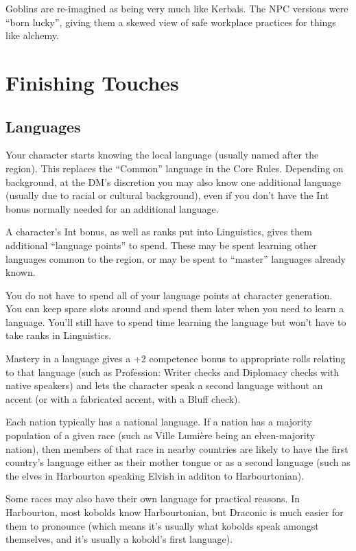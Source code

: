 Goblins are re-imagined as being very much like Kerbals. The NPC versions
were ``born lucky'', giving them a skewed view of safe workplace practices
for things like alchemy.

%
%
\clearpage
\section{Finishing Touches}

%
\subsection{Languages}

Your character starts knowing the local language (usually named after the
region). This replaces the ``Common'' language in the Core Rules. Depending
on background, at the DM's discretion you may also know one additional
language (usually due to racial or cultural background), even if you don't
have the Int bonus normally needed for an additional language.

A character's Int bonus, as well as ranks put into Linguistics, gives them
additional ``language points'' to spend. These may be spent learning other
languages common to the region, or may be spent to ``master'' languages
already known.

You do not have to spend all of your language points at character
generation. You can keep spare slots around and spend them later when you
need to learn a language. You'll still have to spend time learning the
language but won't have to take ranks in Linguistics.

Mastery in a language gives a +2 competence bonus to appropriate rolls
relating to that language (such as Profession: Writer checks and Diplomacy
checks with native speakers) and lets the character speak a second language
without an accent (or with a fabricated accent, with a Bluff check).

Each nation typically has a national language. If a nation has a majority
population of a given race (such as Ville Lumi\`{e}re being an elven-majority
nation), then members of that race in nearby countries are likely to have
the first country's language either as their mother tongue or as a second
language (such as the elves in Harbourton speaking Elvish in additon to
Harbourtonian).

Some races may also have their own language for practical reasons. In
Harbourton, most kobolds know Harbourtonian, but Draconic is much easier
for them to pronounce (which means it's usually what kobolds speak amongst
themselves, and it's usually a kobold's first language).

